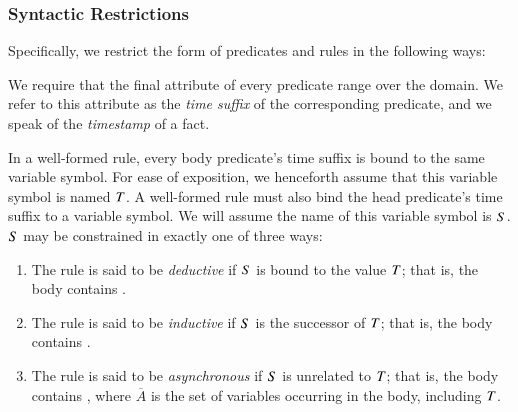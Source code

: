 \subsubsection{Syntactic Restrictions}
\label{sec:syntaxrestrictions}

Specifically, we restrict the form of predicates and rules in the following ways:

We require that the final attribute of every \lang
predicate range over the  domain.  
We refer to this attribute as the \emph{time suffix} of the corresponding
predicate, and we speak of the {\em timestamp} of a fact.

%
%
In a well-formed \lang rule, every body predicate's time suffix is bound to the
same variable symbol.  For ease of exposition, we henceforth assume that this
variable symbol is named $\DT$.  A well-formed \lang rule must also bind the
head predicate's time suffix to a variable symbol.  We will assume the name of
this variable symbol is $\DS$.  $\DS$ may be constrained in exactly one of
three ways:

\begin{enumerate}
%
\item The rule is said to be {\em deductive} if $\DS$ is bound to the value
$\DT$; that is, the body contains \dedalus{$\DS$ = $\DT$}.
%
\item The rule is said to be {\em inductive} if $\DS$ is the successor of
$\DT$; that is, the body contains .
%
\item The rule is said to be {\em asynchronous} if $\DS$ is unrelated to $\DT$;
that is, the body contains , where $\overline{A}$ is the set of variables occurring in the body,
including $\DT$.
%
\end{enumerate}

